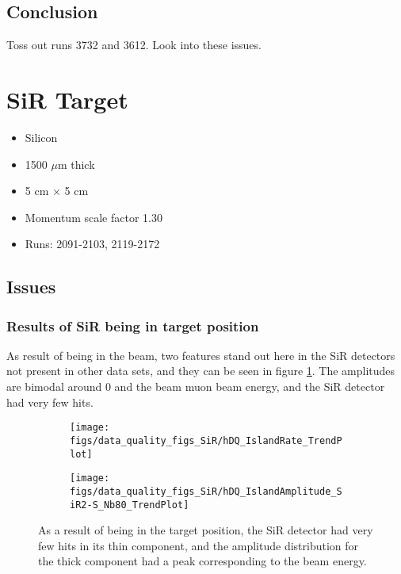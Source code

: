 \documentclass[a4paper]{article}
\begin{document}
\subsection{Conclusion}

Toss out runs 3732 and 3612. Look into these issues.



\section{SiR Target}
\begin{itemize}
  \item Silicon
  \item 1500 $\mu$m thick
  \item 5 cm $\times$ 5 cm
  \item Momentum scale factor 1.30
  \item Runs:
    2091-2103, 2119-2172
\end{itemize}

\subsection{Issues}
\subsubsection{Results of SiR being in target position}
As  result of being in the beam, two features stand out here in the SiR detectors not present
in other data sets, and they can be seen in figure \ref{fig:sir_inbeam}. The amplitudes
are bimodal around 0 and the beam muon beam energy, and the SiR detector had very few hits.

\begin{figure}
  \centering
  \begin{subfigure}{0.5\textwidth}
    \texttt{[image: figs/data\_quality\_figs\_SiR/hDQ\_IslandRate\_TrendPlot]}
  \end{subfigure}%
  \begin{subfigure}{0.5\textwidth}
    \texttt{[image: figs/data\_quality\_figs\_SiR/hDQ\_IslandAmplitude\_SiR2-S\_Nb80\_TrendPlot]}
  \end{subfigure}
  \caption{As a result of being in the target position, the SiR detector had very few hits in
    its thin component, and the amplitude distribution for the thick component had a peak
    corresponding to the beam energy.}
  \label{fig:sir_inbeam}
\end{figure}
\end{document}

